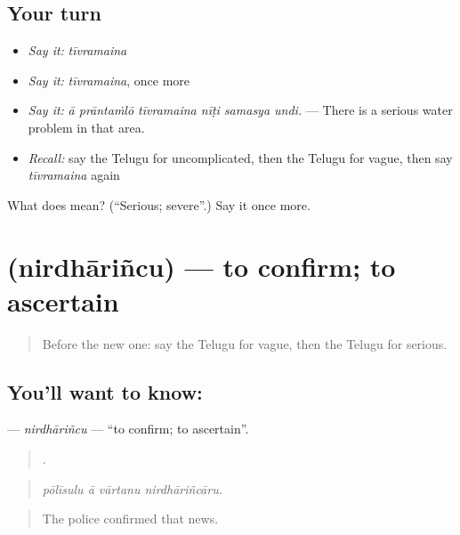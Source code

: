 \subsection*{Your turn}
\begin{itemize}
\raggedright
  \item \emph{Say it:} \emph{tīvramaina}
  \item \emph{Say it:} \emph{tīvramaina}, once more
  \item \emph{Say it:} \emph{ā prāntaṁlō tīvramaina nīṭi samasya undi.} — There is a serious water problem in that area.
  \item \emph{Recall:} say the Telugu for uncomplicated, then the Telugu for vague, then say \emph{tīvramaina} again
\end{itemize}

\begin{tcolorbox}[breakable,colback=teal!4,colframe=teal!35!black,title={Before you move on}]
What does  mean? (\textquotedblleft{}Serious; severe\textquotedblright{}.) Say it once more.
\end{tcolorbox}
\section[\texorpdfstring{\te{నిర్ధారించు} (nirdhāriñcu)}{నిర్ధారించు (nirdhāriñcu)}]{ (nirdhāriñcu) — to confirm; to ascertain}

\label{lesson:TE-C437-nirdharincu}



\begin{quote}
Before the new one: say the Telugu for vague, then the Telugu for serious.
\end{quote}

\subsection*{You'll want to know: }
\textbf{} — \emph{nirdhāriñcu} — \textquotedblleft{}to confirm; to ascertain\textquotedblright{}.

\begin{quote}
   .
\end{quote}

\begin{quote}
\emph{pōlīsulu ā vārtanu nirdhāriñcāru.}
\end{quote}

\begin{quote}
The police confirmed that news.
\end{quote}

